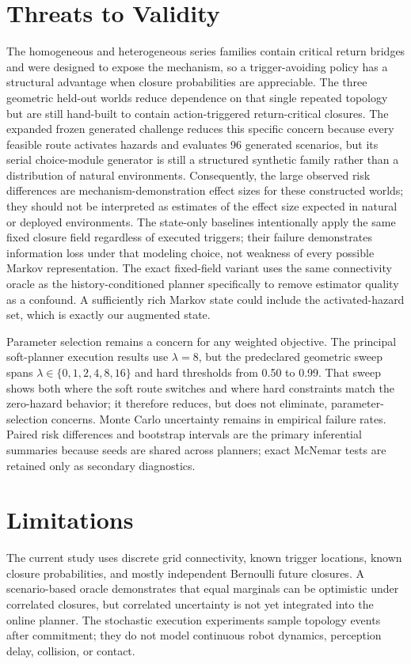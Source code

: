 \documentclass[conference]{IEEEtran}
\begin{document}
\section{Threats to Validity}
The homogeneous and heterogeneous series families contain critical return bridges and were designed to expose the mechanism, so a trigger-avoiding policy has a structural advantage when closure probabilities are appreciable. The three geometric held-out worlds reduce dependence on that single repeated topology but are still hand-built to contain action-triggered return-critical closures. The expanded frozen generated challenge reduces this specific concern because every feasible route activates hazards and evaluates 96 generated scenarios, but its serial choice-module generator is still a structured synthetic family rather than a distribution of natural environments. Consequently, the large observed risk differences are mechanism-demonstration effect sizes for these constructed worlds; they should not be interpreted as estimates of the effect size expected in natural or deployed environments. The state-only baselines intentionally apply the same fixed closure field regardless of executed triggers; their failure demonstrates information loss under that modeling choice, not weakness of every possible Markov representation. The exact fixed-field variant uses the same connectivity oracle as the history-conditioned planner specifically to remove estimator quality as a confound. A sufficiently rich Markov state could include the activated-hazard set, which is exactly our augmented state.

Parameter selection remains a concern for any weighted objective. The principal soft-planner execution results use $\lambda=8$, but the predeclared geometric sweep spans $\lambda\in\{0,1,2,4,8,16\}$ and hard thresholds from 0.50 to 0.99. That sweep shows both where the soft route switches and where hard constraints match the zero-hazard behavior; it therefore reduces, but does not eliminate, parameter-selection concerns. Monte Carlo uncertainty remains in empirical failure rates. Paired risk differences and bootstrap intervals are the primary inferential summaries because seeds are shared across planners; exact McNemar tests are retained only as secondary diagnostics.

\section{Limitations}
The current study uses discrete grid connectivity, known trigger locations, known closure probabilities, and mostly independent Bernoulli future closures. A scenario-based oracle demonstrates that equal marginals can be optimistic under correlated closures, but correlated uncertainty is not yet integrated into the online planner. The stochastic execution experiments sample topology events after commitment; they do not model continuous robot dynamics, perception delay, collision, or contact.
\end{document}

